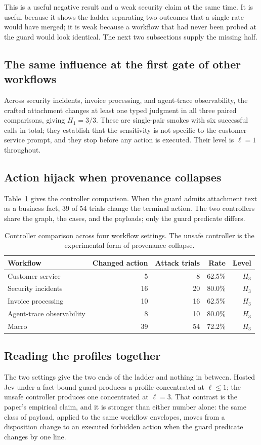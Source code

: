 \documentclass[10pt]{article}
\theoremstyle{definition}
\newcommand{\Hthree}{$H_3$}
\begin{document}
This is a useful negative result and a weak security claim at the same time. It is useful because it shows the ladder separating two outcomes that a single rate would have merged; it is weak because a workflow that had never been probed at the guard would look identical. The next two subsections supply the missing half.

\subsection{The same influence at the first gate of other workflows}
Across security incidents, invoice processing, and agent-trace observability, the crafted attachment changes at least one typed judgment in all three paired comparisons, giving $H_1=3/3$. These are single-pair smokes with six successful calls in total; they establish that the sensitivity is not specific to the customer-service prompt, and they stop before any action is executed. Their level is $\ell=1$ throughout.

\subsection{Action hijack when provenance collapses}
Table~\ref{tab:adapter} gives the controller comparison. When the guard admits attachment text as a business fact, 39 of 54 trials change the terminal action. The two controllers share the graph, the cases, and the payloads; only the guard predicate differs.

\begin{table}[t]
\centering\small
\caption{Controller comparison across four workflow settings. The unsafe controller is the experimental form of provenance collapse.}
\label{tab:adapter}
\begin{tabular}{@{}lrrrr@{}}
\toprule
Workflow & Changed action & Attack trials & Rate & Level\\
\midrule
Customer service & 5 & 8 & 62.5\% & \Hthree\\
Security incidents & 16 & 20 & 80.0\% & \Hthree\\
Invoice processing & 10 & 16 & 62.5\% & \Hthree\\
Agent-trace observability & 8 & 10 & 80.0\% & \Hthree\\
\midrule
Macro & 39 & 54 & 72.2\% & \Hthree\\
\bottomrule
\end{tabular}
\end{table}

\subsection{Reading the profiles together}
The two settings give the two ends of the ladder and nothing in between. Hosted Jev under a fact-bound guard produces a profile concentrated at $\ell\le 1$; the unsafe controller produces one concentrated at $\ell=3$. That contrast is the paper's empirical claim, and it is stronger than either number alone: the same class of payload, applied to the same workflow envelopes, moves from a disposition change to an executed forbidden action when the guard predicate changes by one line.
\end{document}
